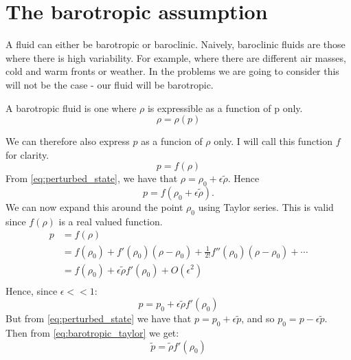 \section{The barotropic assumption} \label{ss:barotropic_assumption}
A fluid can either be barotropic or baroclinic.
%
Naively, baroclinic fluids are those where there is high variability. For example, where there are different air masses, cold and warm fronts or weather. In the problems we are going to consider this will not be the case - our fluid will be barotropic.
    \begin{defn} \cite{shames02mechanics} A barotropic fluid is one where $\rho$ is expressible as a function of p only.
        \[ \rho = \rho(p)
        \]
    \end{defn}
%
We can therefore also express $p$ as a funcion of $\rho$ only. I will call this function $f$ for clarity.
    \begin{equation}\label{eq:defn_f}
         p = f(\rho)
    \end{equation}
%
From \eqref{eq:perturbed_state}, we have that $\rho = \rho_0 + \epsilon \tilde{\rho}$. Hence
    \begin{equation*}
        p = f(\rho_0 + \epsilon\tilde{\rho}).
    \end{equation*}
%
We can now expand this around the point $\rho_0$ using Taylor series. This is valid since $f(\rho)$ is a real valued function.
    \begin{align*}
        p &= f(\rho) \\
        & = f(\rho_0) + f'(\rho_0)(\rho - \rho_0) + \frac{1}{2!}f''(\rho_0)(\rho - \rho_0) + \dotsb \\
        &= f(\rho_0) + \epsilon \tilde{\rho}f'(\rho_0) + O(\epsilon^2)\\
    \end{align*}
%
Hence, since $\epsilon << 1$:
    \begin{equation}\label{eq:barotropic_taylor}
        p = p_0 + \epsilon \tilde{\rho}f'(\rho_0)
    \end{equation}
%
But from \eqref{eq:perturbed_state} we have that $p = p_0 + \epsilon \tilde{p}$, and so $p_0 = p - \epsilon\tilde{p}$. Then from \eqref{eq:barotropic_taylor} we get:
    \begin{equation}\label{eq:barotropic_condition}
        \tilde{p} = \tilde{\rho} f'(\rho_0)
    \end{equation}
